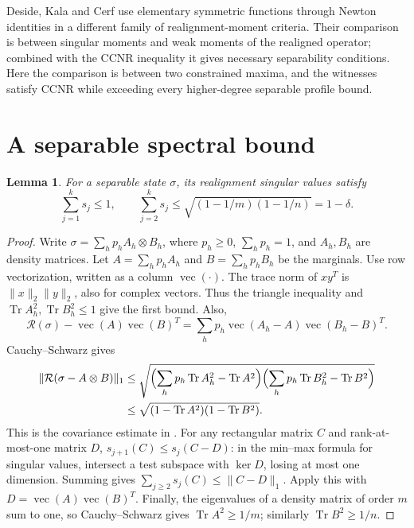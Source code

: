 \documentclass[11pt]{article}
\newtheorem{lemma}[theorem]{Lemma}
\newcommand{\tr}{\operatorname{Tr}}
\newcommand{\R}{\mathcal R}
\begin{document}
Deside, Kala and Cerf \cite[Appendix~D, equations~(D23)--(D35)]{DKC}
use elementary symmetric functions through Newton identities in a
different family of realignment-moment criteria. Their comparison is
between singular moments and weak moments of the realigned operator;
combined with the CCNR inequality it gives necessary separability
conditions. Here the comparison is between two constrained maxima, and
the witnesses satisfy CCNR while exceeding every higher-degree separable
profile bound.

\section{A separable spectral bound}
\begin{lemma}\label{tail}
For a separable state $\sigma$, its realignment singular values satisfy
\[
 \sum_{j=1}^k s_j\le1,\qquad
 \sum_{j=2}^k s_j\le\sqrt{(1-1/m)(1-1/n)}=1-\delta.
\]
\end{lemma}
\begin{proof}
Write $\sigma=\sum_h p_h A_h\otimes B_h$, where $p_h\ge0$,
$\sum_h p_h=1$, and $A_h,B_h$ are density matrices. Let $A=\sum_h p_hA_h$
and $B=\sum_h p_hB_h$ be the marginals. Use row vectorization, written
as a column $\operatorname{vec}(\cdot)$. The trace norm of
$xy^T$ is $\|x\|_2\|y\|_2$, also for complex vectors. Thus the triangle
inequality and $\tr A_h^2,\tr B_h^2\le1$ give the first bound.
Also,
\[
 \R(\sigma)-\operatorname{vec}(A)\operatorname{vec}(B)^T
 =\sum_h p_h\operatorname{vec}(A_h-A)
                  \operatorname{vec}(B_h-B)^T.
\]
Cauchy--Schwarz gives
\begin{align*}
 \|\R(\sigma-A\otimes B)\|_1
 &\le\sqrt{\Bigl(\sum_h p_h\tr A_h^2-\tr A^2\Bigr)
                   \Bigl(\sum_h p_h\tr B_h^2-\tr B^2\Bigr)}\\
 &\le\sqrt{(1-\tr A^2)(1-\tr B^2)}.
\end{align*}
This is the covariance estimate in \cite[Theorem~1]{ZZZG}.
For any rectangular matrix $C$ and rank-at-most-one matrix $D$,
$s_{j+1}(C)\le s_j(C-D)$: in the min--max formula for singular values,
intersect a test subspace with $\ker D$, losing at most one dimension.
Summing gives $\sum_{j\ge2}s_j(C)\le\|C-D\|_1$.
Apply this with $D=\operatorname{vec}(A)\operatorname{vec}(B)^T$.
Finally, the eigenvalues of a density matrix of order $m$ sum to one,
so Cauchy--Schwarz gives $\tr A^2\ge1/m$; similarly $\tr B^2\ge1/n$.
\end{proof}
\end{document}
